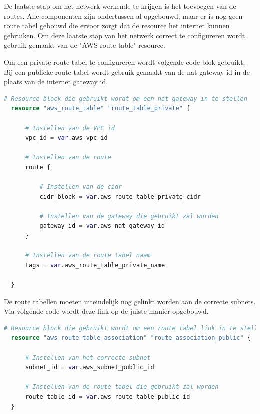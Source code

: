 \vspace{0.5cm}
De laatste stap om het netwerk werkende te krijgen is het toevoegen van de routes. Alle componenten zijn ondertussen al opgebouwd, maar er is nog geen route tabel gebouwd die ervoor zorgt dat de resource het internet kunnen gebruiken. Om deze laatste stap van het netwerk correct te configureren wordt gebruik gemaakt van de "AWS route table" resource. 
\newline

Om een private route tabel te configureren wordt volgende code blok gebruikt. Bij een publieke route tabel wordt gebruik gemaakt van de nat gateway id in de plaats van de internet gateway id.
\newline

\begin{lstlisting}[language=terraform]  
  # Resource block die gebruikt wordt om een nat gateway in te stellen
  resource "aws_route_table" "route_table_private" {
  
      # Instellen van de VPC id
      vpc_id = var.aws_vpc_id
  
      # Instellen van de route
      route {
  
          # Instellen van de cidr
          cidr_block = var.aws_route_table_private_cidr
  
          # Instellen van de gateway die gebruikt zal worden
          gateway_id = var.aws_nat_gateway_id
      }
  
      # Instellen van de route tabel naam
      tags = var.aws_route_table_private_name
    
  }
\end{lstlisting}

\vspace{0.5cm}
De route tabellen moeten uiteindelijk nog gelinkt worden aan de correcte subnets. Via volgende code wordt deze link op de juiste manier opgebouwd.

\begin{lstlisting}[language=terraform]  
  # Resource block die gebruikt wordt om een route tabel link in te stellen
  resource "aws_route_table_association" "route_association_public" {
      
      # Instellen van het correcte subnet
      subnet_id = var.aws_subnet_public_id
  
      # Instellen van de route tabel die gebruikt zal worden
      route_table_id = var.aws_route_table_public_id
  }
  
\end{lstlisting}

